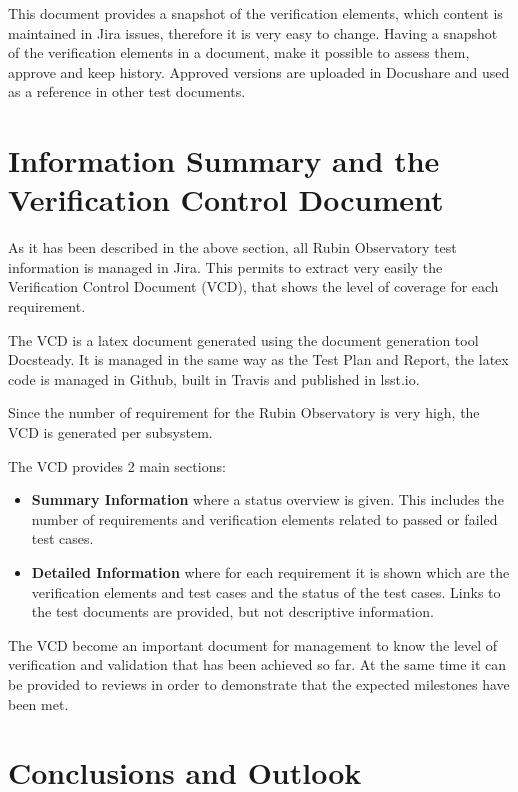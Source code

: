 This document provides a snapshot of the verification elements, which content is maintained in Jira issues, therefore it is very easy to change.
Having a snapshot of the verification elements in a document, make it possible to assess them, approve and keep history.
Approved versions are uploaded in Docushare and used as a reference in other test documents.


\section{Information Summary and the Verification Control Document}

As it has been described in the above section, all Rubin Observatory test information is managed in Jira. 
This permits to extract very easily the Verification Control Document (VCD), that shows the level of coverage for each requirement.

The VCD is a latex document generated using the document generation tool Docsteady. 
It is managed in the same way as the Test Plan and Report, the latex code is managed in Github,
built in Travis and published in lsst.io.

Since the number of requirement for the Rubin Observatory is very high, the VCD is generated per subsystem.

The VCD provides 2 main sections:

\begin{itemize}
\item \textbf{Summary Information} where a status overview is given. 
This includes the number of requirements and verification elements related to passed or failed test cases.
\item \textbf{Detailed Information} where for each requirement it is shown which are the verification elements and test cases
and the status of the test cases. Links to the test documents are provided, but not descriptive information.
\end{itemize}

The VCD become an important document for management to know the level of verification and validation that has been achieved so far.
At the same time it can be provided to reviews in order to demonstrate that the expected milestones have been met.

\section{Conclusions and Outlook}





